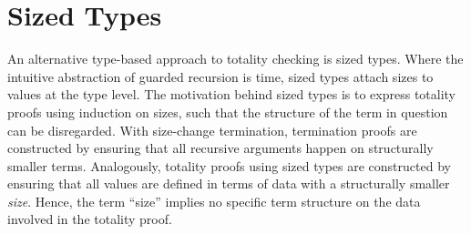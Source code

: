 
\section{Sized Types}
An alternative type-based approach to totality checking is sized types. Where the intuitive abstraction of guarded recursion is time, sized types attach sizes to values at the type level. The motivation behind sized types is to express totality proofs using induction on sizes, such that the structure of the term in question can be disregarded. With size-change termination, termination proofs are constructed by ensuring that all recursive arguments happen on structurally smaller terms. Analogously, totality proofs using sized types are constructed by ensuring that all values are defined in terms of data with a structurally smaller \emph{size}.  Hence, the term ``size'' implies no specific term structure on the data involved in the totality proof.

